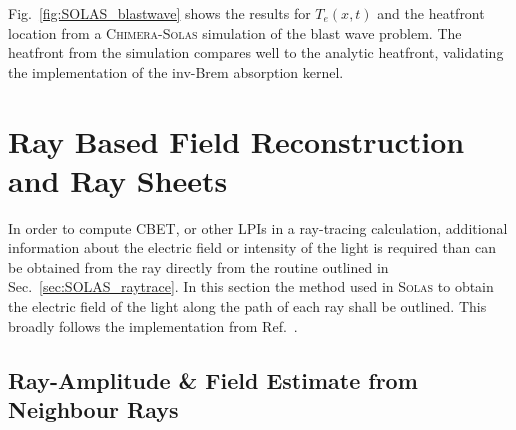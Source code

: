 Fig.~\ref{fig:SOLAS_blastwave} shows the results for $T_e(x,t)$ and the heatfront location from a \textsc{Chimera}-\textsc{Solas} simulation of the blast wave problem.
The heatfront from the simulation compares well to the analytic heatfront, validating the implementation of the \ac{inv-Brem} absorption kernel.


\section{Ray Based Field Reconstruction and Ray Sheets}%
\label{sec:SOLAS_field_reconstruc}

In order to compute \ac{CBET}, or other \ac{LPIs} in a ray-tracing calculation, additional information about the electric field or intensity of the light is required than can be obtained from the ray directly from the routine outlined in Sec.~\ref{sec:SOLAS_raytrace}.
In this section the method used in \textsc{Solas} to obtain the electric field of the light along the path of each ray shall be outlined.
This broadly follows the implementation from Ref.~\cite{follett_validation_2022}.

\subsection{Ray-Amplitude \& Field Estimate from Neighbour Rays}%
\label{sec:SOLAS_ray_amplitude}

